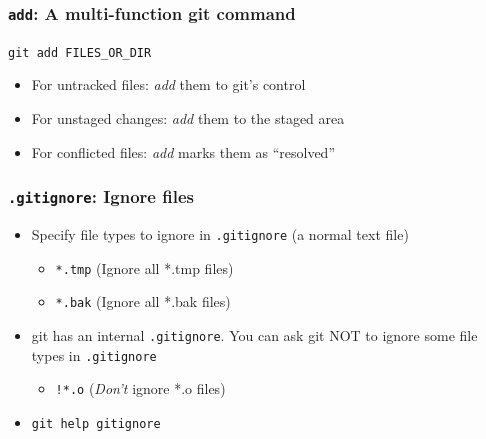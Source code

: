 \documentclass[11pt,ignorenonframetext,]{beamer}
\begin{document}
\begin{frame}[fragile, label=add]\frametitle{\texttt{add}: A multi-function git
command}

\texttt{git add FILES\_OR\_DIR}

\begin{itemize}
\item
  For untracked files: \emph{add} them to git's control
\item
  For unstaged changes: \emph{add} them to the staged area
\item
  For conflicted files: \emph{add} marks them as ``resolved''
\end{itemize}
\end{frame}

\begin{frame}[fragile, label=gitignore]\frametitle{\texttt{.gitignore}: Ignore files}
\begin{itemize}
	\item Specify file types to ignore in \texttt{.gitignore} (a normal text file)
		\begin{itemize}
			\item \texttt{*.tmp} (Ignore all *.tmp files)
			\item \texttt{*.bak} (Ignore all *.bak files)
	       	\end{itemize}
	\item git has an internal \texttt{.gitignore}. You can ask git NOT to ignore some file types in \texttt{.gitignore} 
		\begin{itemize}
			\item \texttt{!*.o} (\emph{Don't} ignore *.o files)
	       	\end{itemize}
	\item \texttt{git help gitignore}
\end{itemize}
\end{frame}
\end{document}
